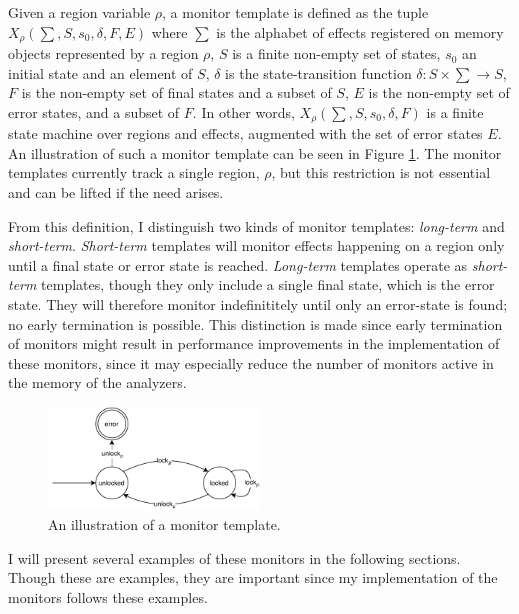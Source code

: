 \newpar Given a region variable $\rho$, a monitor template is defined as the tuple $X_\rho (\sum, S, s_0, \delta, F, E)$ where $\sum$ is the alphabet of effects registered on memory objects represented by a region $\rho$, $S$ is a finite non-empty set of states, $s_0$ an initial state and an element of $S$, $\delta$ is the state-transition function $\delta: S \times \sum \rightarrow S$, $F$ is the non-empty set of final states and a subset of $S$, $E$ is the non-empty set of error states, and a subset of $F$. In other words, $X_\rho (\sum, S, s_0, \delta, F)$ is a finite state machine over regions and effects, augmented with the set of error states $E$. An illustration of such a monitor template can be seen in Figure \ref{double-unlock-automata-intro}. The monitor templates currently track a single region, $\rho$, but this restriction is not essential and can be lifted if the need arises. 

\newpar From this definition, I distinguish two kinds of monitor templates: \textit{long-term} and \textit{short-term}. \textit{Short-term} templates will monitor effects happening on a region only until a final state or error state is reached. \textit{Long-term} templates operate as \textit{short-term} templates, though they only include a single final state, which is the error state. They will therefore monitor indefinititely until only an error-state is found; no early termination is possible. This distinction is made since early termination of monitors might result in performance improvements in the implementation of these monitors, since it may especially reduce the number of monitors active in the memory of the analyzers. 

\begin{figure}[H]
    \centering
    \includegraphics[width=0.5\textwidth]{algorithm/figures/double-unlock}
    \caption{An illustration of a monitor template.}
    \label{double-unlock-automata-intro}
\end{figure}

\newpar I will present several examples of these monitors in the following sections. Though these are examples, they are important since my implementation of the monitors follows these examples. 

